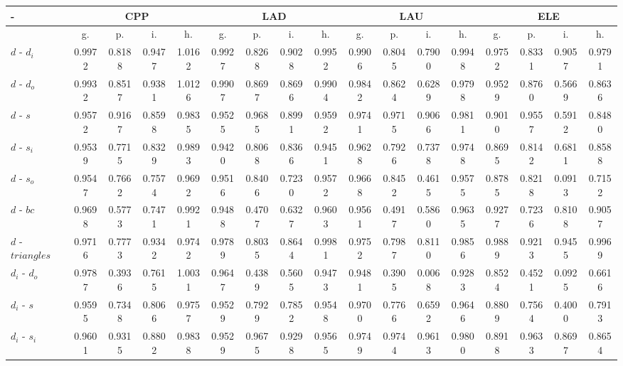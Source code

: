 \documentclass[%
 aip,
 jmp,%
 amsmath,amssymb,
 reprint,%
]{revtex4-1}
\begin{document}
\begin{table}
  \centering
    \footnotesize
\setlength{\tabcolsep}{.26667em}
  \begin{tabular}{|l|| c|c|c|c||  c|c|c|c||   c|c|c|c||   c|c|c|c|}\hline
-\-  & \multicolumn{4}{c|}{CPP} & \multicolumn{4}{c|}{LAD} & \multicolumn{4}{c|}{LAU} & \multicolumn{4}{c|}{ELE} \\ \hline
 & g. & p. & i. & h. &     g. & p. & i. & h. &    g. & p. & i. & h. &    g. & p. & i. & h. \\\hline
$d$ - $d_i$ & 0.9972 & 0.8188 & 0.9477 & 1.0162 & 0.9927 & 0.8268 & 0.9028 & 0.9952 & 0.9906 & 0.8045 & 0.7900 & 0.9948 & 0.9752 & 0.8331 & 0.9057 & 0.9791 \\ \hline
$d$ - $d_o$ & 0.9932 & 0.8517 & 0.9381 & 1.0126 & 0.9907 & 0.8697 & 0.8696 & 0.9904 & 0.9842 & 0.8624 & 0.6289 & 0.9798 & 0.9529 & 0.8760 & 0.5669 & 0.8636 \\ \hline
$d$ - $s$ & 0.9572 & 0.9167 & 0.8598 & 0.9835 & 0.9525 & 0.9685 & 0.8991 & 0.9592 & 0.9741 & 0.9715 & 0.9066 & 0.9811 & 0.9010 & 0.9557 & 0.5912 & 0.8480 \\ \hline
$d$ - $s_i$ & 0.9539 & 0.7715 & 0.8329 & 0.9893 & 0.9420 & 0.8068 & 0.8366 & 0.9451 & 0.9628 & 0.7926 & 0.7378 & 0.9748 & 0.8695 & 0.8142 & 0.6811 & 0.8588 \\ \hline
$d$ - $s_o$ & 0.9547 & 0.7662 & 0.7574 & 0.9692 & 0.9516 & 0.8406 & 0.7230 & 0.9572 & 0.9668 & 0.8452 & 0.4615 & 0.9575 & 0.8785 & 0.8218 & 0.0913 & 0.7152 \\ \hline
$d$ - $bc$ & 0.9698 & 0.5773 & 0.7471 & 0.9921 & 0.9488 & 0.4707 & 0.6327 & 0.9603 & 0.9561 & 0.4917 & 0.5860 & 0.9635 & 0.9277 & 0.7236 & 0.8108 & 0.9057 \\ \hline
$d$ - $triangles$ & 0.9716 & 0.7773 & 0.9342 & 0.9742 & 0.9789 & 0.8035 & 0.8644 & 0.9981 & 0.9752 & 0.7987 & 0.8110 & 0.9856 & 0.9889 & 0.9213 & 0.9455 & 0.9969 \\ \hline
$d_i$ - $d_o$ & 0.9787 & 0.3936 & 0.7615 & 1.0031 & 0.9647 & 0.4389 & 0.5605 & 0.9473 & 0.9481 & 0.3905 & 0.0068 & 0.9283 & 0.8524 & 0.4521 & 0.0925 & 0.6616 \\ \hline
$d_i$ - $s$ & 0.9595 & 0.7348 & 0.8066 & 0.9757 & 0.9529 & 0.7929 & 0.7852 & 0.9548 & 0.9700 & 0.7766 & 0.6592 & 0.9646 & 0.8809 & 0.7564 & 0.4000 & 0.7913 \\ \hline
$d_i$ - $s_i$ & 0.9601 & 0.9315 & 0.8802 & 0.9838 & 0.9529 & 0.9675 & 0.9298 & 0.9565 & 0.9749 & 0.9744 & 0.9613 & 0.9800 & 0.8918 & 0.9633 & 0.8697 & 0.8654 \\ \hline

\end{tabular}
\end{table}
\end{document}
